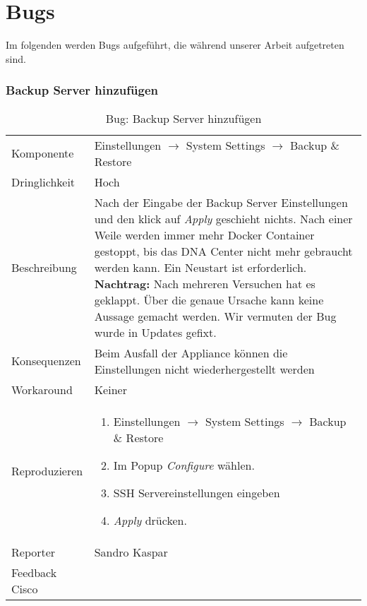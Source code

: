 \section{Bugs}
Im folgenden werden Bugs aufgeführt, die während unserer Arbeit aufgetreten sind. 

\newcommand{\bugreport}[9]{
\subsubsection{#1}
	\begin{table}[H]
		\rowcolors{2}{gray!25}{white}
		\centering
		\begin{tabularx}{\textwidth}{l | X}
			Komponente   & #2       \\
			Dringlichkeit   & #3       \\
			\hline
			Beschreibung   & #4  \\ 
			\hline
			Konsequenzen   & #5  \\ 
			\hline
			Workaround & #6 \\
			\hline
			Reproduzieren & 
			#7
			\\
			\hline
			Reporter  & #8 \\
			Feedback Cisco & #9 \\
		\end{tabularx}
		\caption{Bug: #1}
	\end{table}
}

\bugreport
{Backup Server hinzufügen}
{Einstellungen $\rightarrow$ System Settings $\rightarrow$ Backup \& Restore}
{Hoch}
{Nach der Eingabe der Backup Server Einstellungen und den klick auf \textit{Apply} geschieht nichts. Nach einer Weile werden immer mehr Docker Container gestoppt, bis das DNA Center nicht mehr gebraucht werden kann. Ein Neustart ist erforderlich.
\textbf{Nachtrag:} Nach mehreren Versuchen hat es geklappt. Über die genaue Ursache kann keine Aussage gemacht werden. Wir vermuten der Bug wurde in Updates gefixt. 
}
{Beim Ausfall der Appliance können die Einstellungen nicht wiederhergestellt werden}
{Keiner}
{
	\begin{enumerate}
		\item Einstellungen $\rightarrow$ System Settings $\rightarrow$ Backup \& Restore
		\item Im Popup \textit{Configure} wählen. 
		\item SSH Servereinstellungen eingeben
		\item \textit{Apply} drücken. 
	\end{enumerate}
}
{Sandro Kaspar}
{}

